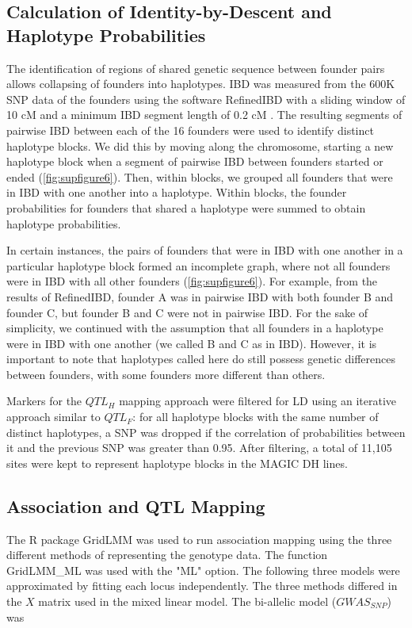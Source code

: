 \documentclass[article,9pt,twocolumn,twoside]{rilabRxiv}
\begin{document}
\subsection{Calculation of Identity-by-Descent and Haplotype Probabilities}
The identification of regions of shared genetic sequence between founder pairs allows collapsing of founders into haplotypes.
IBD was measured from the 600K SNP data of the founders using the software RefinedIBD with a sliding window of 10 cM and a minimum IBD segment length of 0.2 cM \citep{Browning}.
The resulting segments of pairwise IBD between each of the 16 founders were used to identify distinct haplotype blocks.
We did this by moving along the chromosome, starting a new haplotype block when a segment of pairwise IBD between founders started or ended (\ref{fig:supfigure6}).
Then, within blocks, we grouped all founders that were in IBD with one another into a haplotype.
Within blocks, the founder probabilities for founders that shared a haplotype were summed to obtain haplotype probabilities.

In certain instances, the pairs of founders that were in IBD with one another in a particular haplotype block formed an incomplete graph, where  not all founders were in IBD with all other founders (\ref{fig:supfigure6}).
For example, from the results of RefinedIBD, founder A was in pairwise IBD with both founder B and founder C, but founder B and C were not in pairwise IBD.
For the sake of simplicity, we continued with the assumption that all founders in a haplotype were in IBD with one another (we called B and C as in IBD).
However, it is important to note that haplotypes called here do still possess genetic differences between founders, with some founders more different than others.

Markers for the $QTL_H$ mapping approach were filtered for LD using an iterative approach similar to $QTL_F$: for all haplotype blocks with the same number of distinct haplotypes, a SNP was dropped if the correlation of probabilities between it and the previous SNP was greater than 0.95.
After filtering, a total of 11,105 sites were kept to represent haplotype blocks in the MAGIC DH lines.

\subsection{Association and QTL Mapping}
The R package GridLMM \citep{Runcie} was used to run association mapping using the three different methods of representing the genotype data.
The function GridLMM\_ML was used with the "ML" option.
The following three models were approximated by fitting each locus independently.
The three methods differed in the $X$ matrix used in the mixed linear model.
The bi-allelic model ($GWAS_{SNP}$) was
\end{document}
